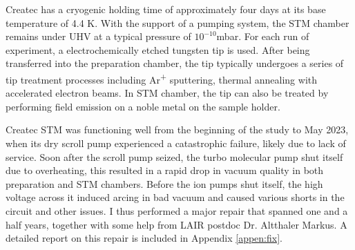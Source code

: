 Createc has a cryogenic holding time of approximately four days at its base temperature of 4.4 K. With the support of a pumping system, the STM chamber remains under UHV at a typical pressure of $10^{-10}$mbar. For each run of experiment, a electrochemically etched tungsten tip is used. After being transferred into the preparation chamber, the tip typically undergoes a series of tip treatment processes including Ar\textsuperscript{+} sputtering, thermal annealing with accelerated electron beams. In STM chamber, the tip can also be treated by performing field emission on a noble metal on the sample holder. 

Createc \ac{STM} was functioning well from the beginning of the study to May 2023, when its dry scroll pump experienced a catastrophic failure, likely due to lack of service. Soon after the scroll pump seized, the turbo molecular pump shut itself due to overheating, this resulted in a rapid drop in vacuum quality in both preparation and STM chambers. Before the ion pumps shut itself, the high voltage across it induced arcing in bad vacuum and caused various shorts in the circuit and other issues. I thus performed a major repair that spanned one and a half years, together with some help from LAIR postdoc Dr. Altthaler Markus. A detailed report on this repair is included in Appendix \ref{appen:fix}. 

